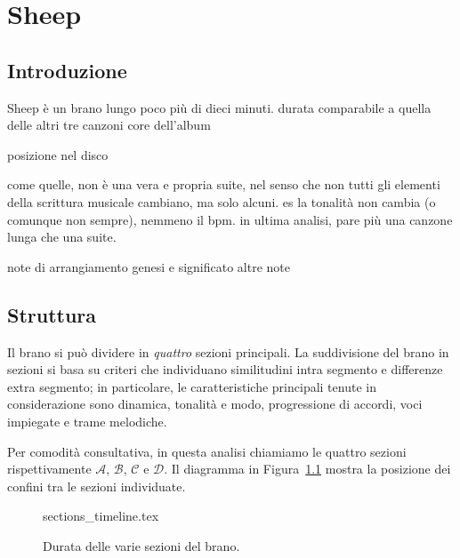 \documentclass[class=book, crop=false, oneside, 12pt]{standalone}
\begin{document}
    \chapter{Sheep}

    \section{Introduzione}
    \label{sec:04-intro}

    Sheep è un brano lungo poco più di dieci minuti. 
    durata comparabile a quella delle altri tre canzoni core dell'album

    posizione nel disco
    
    
    come quelle, non è una vera e propria suite, nel senso che non tutti gli elementi della scrittura musicale cambiano, ma solo alcuni. es la tonalità non cambia (o comunque non sempre), nemmeno il bpm. in ultima analisi, pare più una canzone lunga che una suite.

    note di arrangiamento
    genesi e significato
    altre note



    \section{Struttura}
    \label{sec:04-struttura}

    Il brano si può dividere in \emph{quattro} sezioni principali.
    La suddivisione del brano in sezioni si basa su criteri che individuano similitudini intra segmento e differenze extra segmento; in particolare, le caratteristiche principali tenute in considerazione sono dinamica, tonalità e modo, progressione di accordi, voci impiegate e trame melodiche.

    Per comodità consultativa, in questa analisi chiamiamo le quattro sezioni rispettivamente \(\mathcal{A}\), \(\mathcal{B}\), \(\mathcal{C}\) e \(\mathcal{D}\). Il diagramma in Figura~\ref{fig:04-sections-timeline} mostra la posizione dei confini tra le sezioni individuate.

    \begin{figure}[htbp]
        \centering
        {sections_timeline.tex}
        \caption{Durata delle varie sezioni del brano.}
        \label{fig:04-sections-timeline}
    \end{figure}
\end{document}
